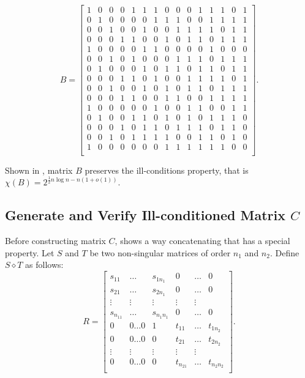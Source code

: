 \documentclass[11pt]{article}
\begin{document}
$$B=
\left[\begin{smallmatrix}
    1 & 0 & 0 & 0 & 1 & 1 & 1 & 0 & 0 & 0 & 1 & 1 & 1 & 0 & 1 \\
    0 & 1 & 0 & 0 & 0 & 0 & 1 & 1 & 1 & 0 & 0 & 1 & 1 & 1 & 1 \\
    0 & 0 & 1 & 0 & 0 & 1 & 0 & 0 & 1 & 1 & 1 & 1 & 0 & 1 & 1 \\
    0 & 0 & 0 & 1 & 1 & 0 & 0 & 1 & 0 & 1 & 1 & 0 & 1 & 1 & 1 \\
    1 & 0 & 0 & 0 & 0 & 1 & 1 & 0 & 0 & 0 & 0 & 1 & 0 & 0 & 0 \\
    0 & 0 & 1 & 0 & 1 & 0 & 0 & 0 & 1 & 1 & 1 & 0 & 1 & 1 & 1 \\
    0 & 1 & 0 & 0 & 0 & 1 & 0 & 1 & 1 & 0 & 1 & 1 & 0 & 1 & 1 \\
    0 & 0 & 0 & 1 & 1 & 0 & 1 & 0 & 0 & 1 & 1 & 1 & 1 & 0 & 1 \\
    0 & 0 & 1 & 0 & 0 & 1 & 0 & 1 & 0 & 1 & 1 & 0 & 1 & 1 & 1 \\
    0 & 0 & 0 & 1 & 1 & 0 & 0 & 1 & 1 & 0 & 0 & 1 & 1 & 1 & 1 \\
    1 & 0 & 0 & 0 & 0 & 0 & 1 & 0 & 0 & 1 & 1 & 0 & 0 & 1 & 1 \\
    0 & 1 & 0 & 0 & 1 & 1 & 0 & 1 & 0 & 1 & 0 & 1 & 1 & 1 & 0 \\
    0 & 0 & 0 & 1 & 0 & 1 & 1 & 0 & 1 & 1 & 1 & 0 & 1 & 1 & 0 \\
    0 & 0 & 1 & 0 & 1 & 1 & 1 & 1 & 0 & 0 & 1 & 1 & 0 & 1 & 0 \\
    1 & 0 & 0 & 0 & 0 & 0 & 0 & 1 & 1 & 1 & 1 & 1 & 1 & 0 & 0 \\
\end{smallmatrix}\right].
$$

Shown in \cite{ALON1997133}, matrix $B$ preserves the ill-conditions property, that is $\chi(B)=2^{\frac{1}{2}n\log n-n(1+o(1))}$.

\subsection{Generate and Verify Ill-conditioned Matrix $C$}
Before constructing matrix $C$, \cite{ALON1997133} shows a way concatenating that has a special property. Let $S$ and $T$ be two non-singular matrices of order $n_1$ and $n_2$. Define $S \diamond T$ as follows:
$$R=
\left[\begin{smallmatrix}
    s_{11} & \dots & s_{1n_1} & 0 & \dots  & 0 \\
    s_{21} & \dots & s_{2n_1} & 0 & \dots  & 0 \\
    \vdots & \vdots & \vdots & \vdots & \vdots \\
    s_{n_11} & \dots & s_{n_1n_1} & 0 & \dots  & 0 \\
    0 & 0 \dots 0 & 1 & t_{11} & \dots & t_{1n_2} \\
    0 & 0 \dots 0 & 0 & t_{21} & \dots & t_{2n_2} \\
    \vdots & \vdots & \vdots & \vdots & \vdots \\
    0 & 0 \dots 0 & 0 & t_{n_21} & \dots & t_{n_2n_2} \\
\end{smallmatrix}\right].
$$
\end{document}
